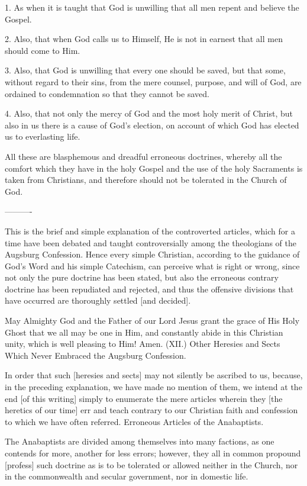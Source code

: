 1. As when it is taught that God is unwilling that all men repent and believe the Gospel.

2. Also, that when God calls us to Himself, He is not in earnest that all men should come to Him.

3. Also, that God is unwilling that every one should be saved, but that some, without regard to their sins, from the mere counsel, purpose, and will of God, are ordained to condemnation so that they cannot be saved.

4. Also, that not only the mercy of God and the most holy merit of Christ, but also in us there is a cause of God's election, on account of which God has elected us to everlasting life.

All these are blasphemous and dreadful erroneous doctrines, whereby all the comfort which they have in the holy Gospel and the use of the holy Sacraments is taken from Christians, and therefore should not be tolerated in the Church of God.

----------

This is the brief and simple explanation of the controverted articles, which for a time have been debated and taught controversially among the theologians of the Augsburg Confession. Hence every simple Christian, according to the guidance of God's Word and his simple Catechism, can perceive what is right or wrong, since not only the pure doctrine has been stated, but also the erroneous contrary doctrine has been repudiated and rejected, and thus the offensive divisions that have occurred are thoroughly settled [and decided].

May Almighty God and the Father of our Lord Jesus grant the grace of His Holy Ghost that we all may be one in Him, and constantly abide in this Christian unity, which is well pleasing to Him! Amen.
(XII.) Other Heresies and Sects Which Never Embraced the Augsburg Confession.

In order that such [heresies and sects] may not silently be ascribed to us, because, in the preceding explanation, we have made no mention of them, we intend at the end [of this writing] simply to enumerate the mere articles wherein they [the heretics of our time] err and teach contrary to our Christian faith and confession to which we have often referred.
Erroneous Articles of the Anabaptists.

The Anabaptists are divided among themselves into many factions, as one contends for more, another for less errors; however, they all in common propound [profess] such doctrine as is to be tolerated or allowed neither in the Church, nor in the commonwealth and secular government, nor in domestic life.

